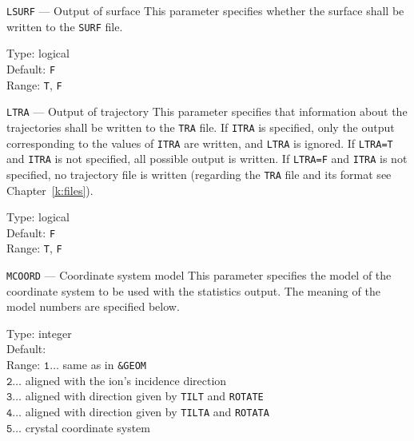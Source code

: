 \ifprivate
\begin{keydescription}{\texttt{LSURF} --- Output of surface}
%
  This parameter specifies whether the surface shall be written to the \texttt{SURF} file.
 \begin{keytab}
    Type:    \> logical \\
    Default: \> \texttt{F} \\
    Range:   \> \texttt{T}, \texttt{F} 
  \end{keytab}
\end{keydescription}
\fi

\begin{keydescription}{\texttt{LTRA} --- Output of trajectory}
%
  This parameter specifies that information about the trajectories shall be written to the 
  \texttt{TRA} file. If \texttt{ITRA} is specified, only the output corresponding to the values 
  of \texttt{ITRA} are written, and \texttt{LTRA} is ignored. If \texttt{LTRA=T} and 
  \texttt{ITRA} is not specified, all possible output is written. If \texttt{LTRA=F} and
  \texttt{ITRA} is not specified, no trajectory file is written (regarding the \texttt{TRA} 
  file and its format see Chapter~\ref{k:files}).
  \begin{keytab}
    Type:    \> logical \\
    Default: \> \texttt{F} \\
    Range:   \> \texttt{T}, \texttt{F} 
  \end{keytab}
\end{keydescription}

\begin{keydescription}{\texttt{MCOORD} --- Coordinate system model}
%
  This parameter specifies the model of the coordinate system to be used with the statistics 
  output. The meaning of the model numbers are specified below.
  \begin{keytab}
    Type:    \> integer \\
    Default:  \\
    Range:   \> $\texttt{1} \ldots $ same as in \texttt{\&GEOM} \\
             \> $\texttt{2} \ldots $ aligned with the ion's incidence direction \\
             \> $\texttt{3} \ldots $ aligned with direction given by \texttt{TILT} and 
                \texttt{ROTATE} \\
             \> $\texttt{4} \ldots $ aligned with direction given by \texttt{TILTA} and 
                \texttt{ROTATA} \\
             \> $\texttt{5} \ldots $ crystal coordinate system
  \end{keytab}
\end{keydescription}

